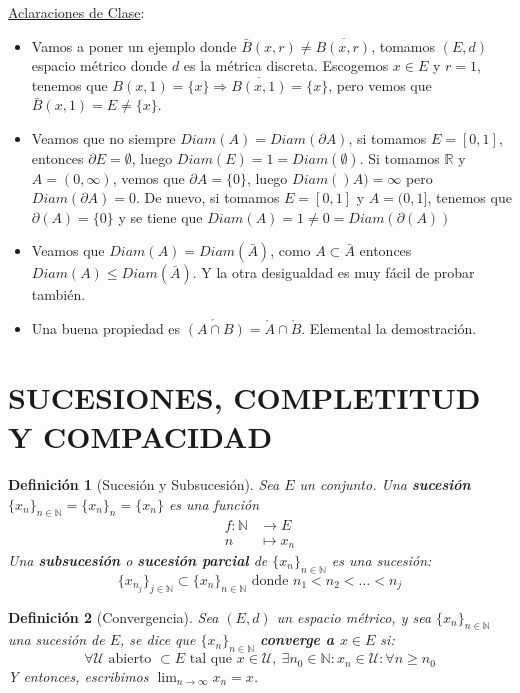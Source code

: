 \documentclass[10pt,a4paper,openright]{book}
\theoremstyle{break}
\newtheorem*{defi}{Definición}
\begin{document}
\underline{Aclaraciones de Clase}:
\begin{itemize}
\item Vamos a poner un ejemplo donde $\bar{B}(x,r)\neq \overline{B(x,r)}$, tomamos $(E,d)$ espacio métrico donde $d$ es la métrica discreta. Escogemos $x\in E$ y $r=1$, tenemos que $B(x,1)=\{x\}\Rightarrow \overline{B(x,1)} = \{x\}$, pero vemos que $\bar{B}(x,1) = E \neq \{x\}$.

\item Veamos que no siempre $Diam(A) = Diam (\partial A)$, si tomamos $E=[0,1]$, entonces $\partial E = \emptyset$, luego $Diam (E) =1 = Diam(\emptyset)$. Si tomamos $\mathbb{R}$ y $A=(0,\infty)$, vemos que $\partial A =\{0\}$, luego $Diam()A) = \infty$ pero $Diam (\partial A) = 0$. De nuevo, si tomamos $E=[0,1]$ y $A=(0,1]$, tenemos que $\partial(A) = \{0\}$ y se tiene que $Diam(A) = 1 \neq 0 = Diam (\partial(A))$

\item Veamos que $Diam(A) = Diam (\bar{A})$, como $A\subset \bar{A}$ entonces $Diam(A) \leq Diam (\bar{A})$. Y la otra desigualdad es muy fácil de probar también.

\item Una buena propiedad es $\mathring{(A\cap B)} = \mathring{A} \cap \mathring{B}$. Elemental la demostración.
\end{itemize}

\section*{SUCESIONES, COMPLETITUD Y COMPACIDAD}
\begin{defi}[Sucesión y Subsucesión]
Sea $E$ un conjunto. Una \textbf{sucesión} $\{x_n\}_{n \in \mathbb{N}} = \{x_n\}_n = \{x_n\}$ es una función 
\begin{align*}
f : \mathbb{N} &\to E \\ n &\mapsto x_n
\end{align*}
Una \textbf{subsucesión} o \textbf{sucesión parcial} de $\{x_n\}_{n \in \mathbb{N}}$ es una sucesión:
$$\{x_{n_j}\}_{j \in \mathbb{N}} \subset \{x_n\}_{n \in \mathbb{N}} \mbox{ donde } n_1 < n_2 < \ldots < n_j$$
\end{defi}

\begin{defi}[Convergencia]
Sea $(E,d)$ un espacio métrico, y sea $\{x_n\}_{n \in \mathbb{N}}$ una sucesión de $E$, se dice que $\{x_n\}_{n \in \mathbb{N}}$ \textbf{converge a $x \in E$} si:
$$\forall \mathcal{U} \mbox{ abierto } \subset E \mbox{ tal que } x\in \mathcal{U}, \ \exists n_0 \in \mathbb{N} : x_n \in \mathcal{U} : \forall n \geq n_0$$
Y entonces, escribimos $\lim_{n \to \infty} x_n = x$.
\end{defi}
\end{document}
